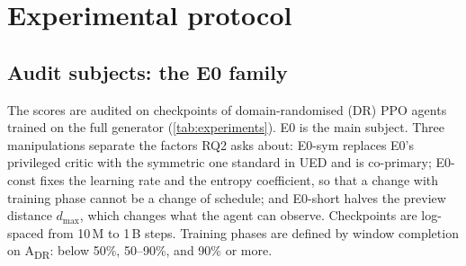 \section{Experimental protocol}
\label{sec:protocol}

\subsection{Audit subjects: the E0 family}
\label{sec:protocol-e0}

The scores are audited on checkpoints of domain-randomised (DR) PPO agents trained on the
full generator (\cref{tab:experiments}). E0 is the main subject. Three manipulations
separate the factors RQ2 asks about: E0-sym replaces E0's privileged critic with the
symmetric one standard in UED and is co-primary; E0-const fixes the learning rate and the
entropy coefficient, so that a change with training phase cannot be a change of schedule;
and E0-short halves the preview distance $d_{\max}$, which changes what the agent can
observe.
Checkpoints are log-spaced from 10\,M to 1\,B steps. Training phases are defined by window
completion on A\textsubscript{DR}: below 50\%, 50--90\%, and 90\% or more.

